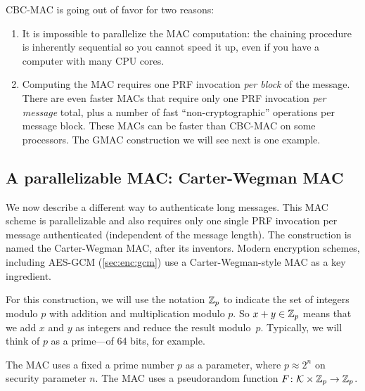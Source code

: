 CBC-MAC is going out of favor for two reasons:
\begin{enumerate}
  \item It is impossible to parallelize the MAC computation:
        the chaining procedure is inherently sequential so you 
        cannot speed it up, even if you have a computer with many 
        CPU cores.
  \item Computing the MAC requires one PRF invocation \emph{per block} of the message.
        There are even faster MACs that require only one PRF invocation
        \emph{per message} total, 
        plus a number of fast ``non-cryptographic'' operations
        per message block.
        These MACs can be faster than CBC-MAC on some processors.
        The GMAC construction we will see next is one example.
\end{enumerate}


\subsection{A parallelizable MAC: Carter-Wegman MAC}\label{sec:mac:cw}

We now describe a different way to authenticate long messages.
This MAC scheme is parallelizable and also requires only one 
single PRF invocation per message authenticated (independent of
the message length).
The construction is named the Carter-Wegman MAC, after its
inventors.\cite{CW81}
Modern encryption schemes, including AES-GCM (\cref{sec:enc:gcm})
use a Carter-Wegman-style MAC as a key ingredient.

For this construction, we will use the notation
$\mathbb{Z}_p$ to indicate the set of integers modulo $p$
with addition and multiplication modulo $p$.
So $x + y \in \mathbb{Z}_p$ means that we add $x$ and $y$
as integers and reduce the result modulo~$p$.
Typically, we will think of $p$ as a prime---of
64 bits, for example.

The MAC uses a fixed a prime number $p$ as a parameter,
where $p \approx 2^n$ on security parameter $n$.
The MAC uses a pseudorandom function 
$F \colon \mathcal{K} \times \mathbb{Z}_p \to \mathbb{Z}_p$.

